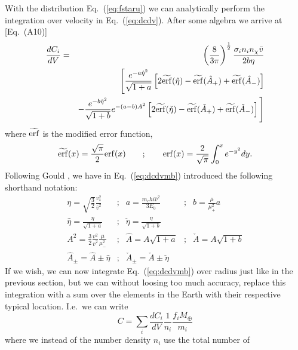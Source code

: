 \documentclass[a4paper,10pt,oneside]{book}
\begin{document}
With the distribution Eq.~(\ref{eq:fstaru}) we can analytically
perform the integration over velocity in Eq.~(\ref{eq:dcdv}). After
some algebra we arrive at \cite{Gould:1987ir}[Eq.~(A10)] 
\begin{eqnarray}
\frac{dC_i}{dV} & = & \left( \frac{8}{3\pi} \right)^{\frac{1}{2}} 
\frac{\sigma_i n_i n_\chi \bar{v}}{2b\eta} \nonumber \\
 & & \Bigg[ \frac{e^{-a\hat{\eta}^2}}{\sqrt{1+a}} \left[ 2 \widetilde{\rm erf}(\hat{\eta}) - \widetilde{\rm erf} (\hat{A}_+) + \widetilde{\rm erf} (\hat{A}_-) \right]
   \nonumber \\ 
& &  - \frac{e^{-b\check{\eta}^2}}{\sqrt{1+b}}
   e^{-(a-b)A^2} \left[ 2 \widetilde{\rm erf}(\check{\eta}) - \widetilde{\rm erf} (\check{A}_+) + \widetilde{\rm erf} (\check{A}_-)
   \right] \Bigg]
   \label{eq:dcdvmb}
\end{eqnarray}
where $\widetilde{\rm erf}$ is the modified error function,
\begin{equation}
\label{eq:moderf}
   \widetilde{\rm erf} (x) = \frac{\sqrt{\pi}}{2} {\rm erf} (x)
   \qquad ; \qquad {\rm erf}(x) = \frac{2}{\sqrt{\pi}} \int_0^x e^{-y^2} dy.
\end{equation}
Following Gould \cite{Gould:1987ir}, we have in Eq.~(\ref{eq:dcdvmb})
introduced the following shorthand notation: 
\begin{equation}
\begin{array}{ccccc}
\eta = \sqrt{\frac{3}{2}} \frac{v_*^2}{\bar{v}^2} & ; &
a = \frac{m_chi \bar{v}^2}{3E_0} & ; & b=\frac{\mu}{\mu_+^2} a \\
\hat{\eta} = \frac{\eta}{\sqrt{1+a}} & ; & \check{\eta} = \frac{\eta}{\sqrt{1+b}} \\
A^2 = \frac{3}{2} \frac{v^2}{\bar{v}^2} \frac{\mu}{\mu_-^2} & ; &
\hat{A} = A \sqrt{1+a} & ; & \check{A} = A \sqrt{1+b} \\
\hat{A}_\pm = \hat{A} \pm \hat{\eta} & ; & \check{A}_\pm = \check{A} \pm \check{\eta}
\end{array}
\end{equation}
If we wish, we can now integrate Eq.~(\ref{eq:dcdvmb}) over radius
just like in the previous section, but we can without loosing too much
accuracy, replace this integration with a sum over the elements in the
Earth with their respective typical location. I.e.\ we can write 
\begin{equation}
\label{ctotmb}
  C = \sum_i \frac{dC_i}{dV}\frac{1}{n_i} \frac{f_i M_\oplus}{m_i}  
\end{equation}
where we instead of the number density $n_i$ use the total number of
\end{document}
